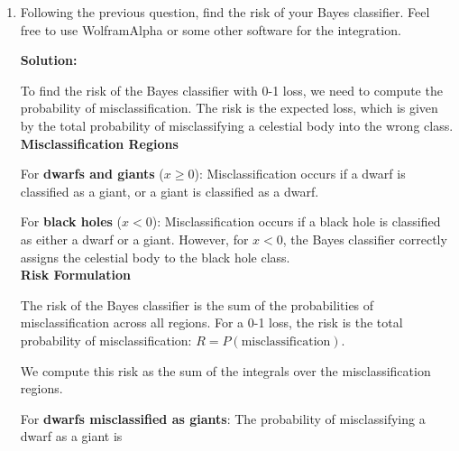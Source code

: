 \documentclass{article}
\newenvironment{solution}{\color{blue} \smallskip \textbf{Solution:}}{}
\begin{document}
\begin{enumerate}
\begin{solution}
\textbf{Decision Rule}

To classify a new data point with observed rate \(x\), if \(x \geq 0\), we compare the posterior probabilities for dwarfs and giants and assign to dwarfs if \( P(\text{dwarf} \mid x) > P(\text{giant} \mid x) \). This leads to the decision boundary where \( \frac{2.4 e^{-4x}}{2.4 e^{-4x} + 0.9 e^{-3x}} > \frac{0.9 e^{-3x}}{2.4 e^{-4x} + 0.9 e^{-3x}} \). If \(x < 0\), we assign the data point to black holes, as they are the only class for which the likelihood is defined for negative values of \(x\).

Thus, the optimal Bayes classifier assigns a new data point based on these posterior probabilities.




\end{solution}

\newpage
\item Following the previous question, find the risk of your Bayes classifier. Feel free to use WolframAlpha or some other software for the integration.

\begin{solution}


To find the risk of the Bayes classifier with 0-1 loss, we need to compute the probability of misclassification. The risk is the expected loss, which is given by the total probability of misclassifying a celestial body into the wrong class.\\

\textbf{Misclassification Regions}

For \textbf{dwarfs and giants} (\(x \geq 0\)): Misclassification occurs if a dwarf is classified as a giant, or a giant is classified as a dwarf.
  
For \textbf{black holes} (\(x < 0\)): Misclassification occurs if a black hole is classified as either a dwarf or a giant. However, for \(x < 0\), the Bayes classifier correctly assigns the celestial body to the black hole class.\\

\textbf{Risk Formulation}

The risk of the Bayes classifier is the sum of the probabilities of misclassification across all regions. For a 0-1 loss, the risk is the total probability of misclassification: \( R = P(\text{misclassification}) \).

We compute this risk as the sum of the integrals over the misclassification regions.

For \textbf{dwarfs misclassified as giants}: The probability of misclassifying a dwarf as a giant is 


\end{solution}
\end{enumerate}
\end{document}
